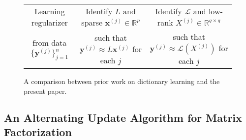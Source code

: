 \documentclass[11pt,letterpaper]{article}
\newcommand{\R}{\mathbb{R}}
\newcommand{\bx}{\mathbf{x}}
\newcommand{\A}{\mathcal{A}}
\newcommand{\by}{\mathbf{y}}
\renewcommand{\L}{\mathcal{L}}
\begin{document}
\begin{figure*}
\begin{tabular}{|c|c|c|}
\hline

Learning regularizer & Identify $L$ and sparse $\bx^{(j)} \in \R^p$ & Identify $\L$ and low-rank $X^{(j)} \in \R^{q \times q}$
\\
from data $\{\by^{(j)}\}_{j=1}^n$ & such that $\by^{(j)} \approx L \bx^{(j)}$ for each $j$ & such that $\by^{(j)} \approx \L(X^{(j)})$ for each $j$
\\


\hline
\end{tabular}
\caption{A comparison between prior work on dictionary learning and the present paper.} \label{fig:comparison}
\end{figure*}







\subsection{An Alternating Update Algorithm for Matrix Factorization} \label{sec:intro_am}


\end{document}
